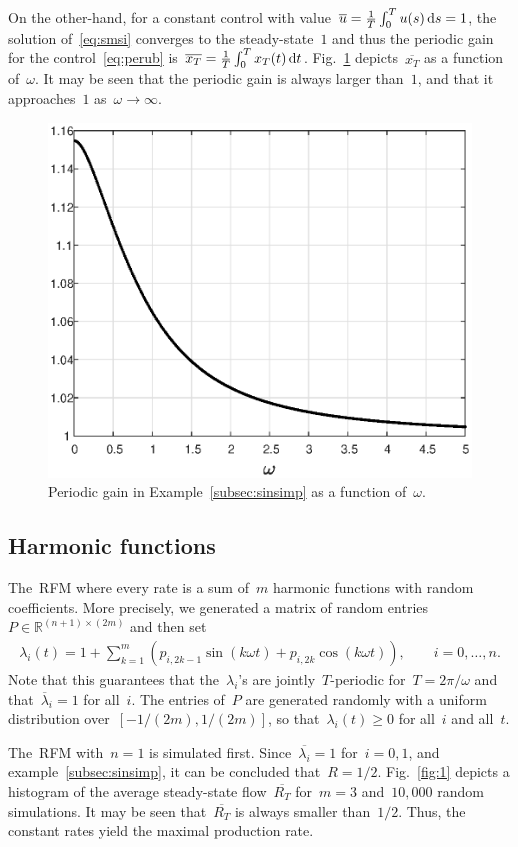 On the other-hand, for a constant control with value~$\overline{u}=\frac{1}{T} \int_0^{T } u(s)\mathop{}\!\mathrm{d} s=1$, the solution of~\eqref{eq:smsi} converges to the steady-state~$1$ and thus the periodic gain for the control~\eqref{eq:perub} is~$\overline {x_T}  = \frac{1}{T} \int_0^{T } x_T(t) \mathop{}\!\mathrm{d} t $. 
Fig.~\ref{fig:sin} depicts~$\overline {x_T} $ as a function of~$\omega$. 
It may be seen that the periodic gain is always larger than~$1$, and that it approaches~$1$ as~$\omega \to \infty$. 

\begin{figure}[t!]
	\centering
	\includegraphics[width=.6\linewidth]{fig/exa_period_forcing.eps}
	\caption{Periodic gain in Example~\ref{subsec:sinsimp}
		as a function of~$\omega$.}
	\label{fig:sin}
\end{figure}

\subsection{Harmonic functions}
The~\ac{RFM} where  every rate is a sum of~$m$ harmonic functions  with random coefficients.
More precisely, we generated a matrix of random entries~$P \in \mathbb{R}^{(n+1)\times(2m)}$ and then set
%
\begin{align} \label{eq:rand} 
	\lambda_i(t) = 1 + \sum_{k=1}^{m} \left( p_{i, 2k-1} \sin(k \omega t) + p_{i, 2k} \cos(k \omega t)\right) , \qquad i=0,\dots,n. 
\end{align}
%
Note that this guarantees that the~$\lambda_i$'s are jointly~$T$-periodic for~$T=2\pi/\omega$ and that~$\overline{\lambda}_i=1$ for all~$i$. 
The entries of~$P$ are generated randomly with a uniform distribution over~$[-1/(2m), 1/(2m)]$, so  that~$\lambda_i(t)\geq 0$ for all~$i$ and all~$t$. 

The~\ac{RFM} with~$n=1$ is simulated first.
Since~$\overline {\lambda_i}=1$ for~$i=0,1$, and example~\ref{subsec:sinsimp}, it can be concluded that~$R=1/2$. 
Fig.~\ref{fig:1} depicts a histogram of the average steady-state flow~$\overline {R_T}$ for~$m=3$ and~$10,000$ random simulations.  
It may be seen that~$\overline{R_T}$ is always smaller than~$1/2$. Thus, the constant rates
yield the maximal  production rate. 

